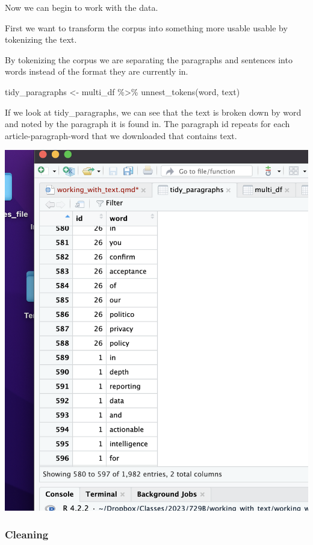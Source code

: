 \documentclass[
  letterpaper,
  DIV=11,
  numbers=noendperiod]{scrartcl}
\newenvironment{Shaded}{\begin{snugshade}}{\end{snugshade}}
\newcommand{\FunctionTok}[1]{\textcolor[rgb]{0.28,0.35,0.67}{#1}}
\newcommand{\NormalTok}[1]{\textcolor[rgb]{0.00,0.23,0.31}{#1}}
\newcommand{\OtherTok}[1]{\textcolor[rgb]{0.00,0.23,0.31}{#1}}
\newcommand{\SpecialCharTok}[1]{\textcolor[rgb]{0.37,0.37,0.37}{#1}}
\begin{document}
Now we can begin to work with the data.

First we want to transform the corpus into something more usable usable
by tokenizing the text.

By tokenizing the corpus we are separating the paragraphs and sentences
into words instead of the format they are currently in.

\begin{Shaded}
\begin{Highlighting}[]
\NormalTok{tidy\_paragraphs }\OtherTok{\textless{}{-}}\NormalTok{ multi\_df }\SpecialCharTok{\%\textgreater{}\%}
  \FunctionTok{unnest\_tokens}\NormalTok{(word, text)}
\end{Highlighting}
\end{Shaded}

If we look at tidy\_paragraphs, we can see that the text is broken down
by word and noted by the paragraph it is found in. The paragraph id
repeats for each article-paragraph-word that we downloaded that contains
text.

\includegraphics{Images/1.png}

\hypertarget{cleaning}{%
\subsubsection{Cleaning}\label{cleaning}}
\end{document}
